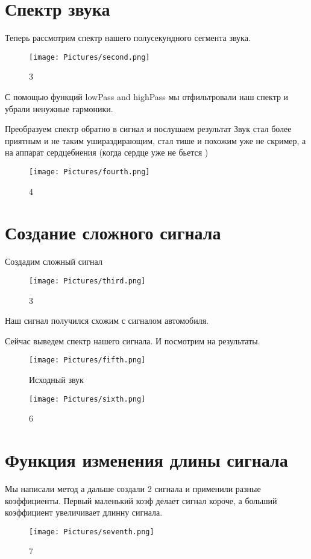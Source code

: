 \documentclass[10pt,a4paper,oneside]{article}
\begin{document}
\section{Спектр звука}

Теперь рассмотрим спектр нашего полусекундного сегмента звука.
\begin{figure}[H]
        \centering
        \texttt{[image: Pictures/second.png]}
        \caption{3}
        \label{fig:second}
\end{figure}

С помощью функций lowPass and highPass мы отфильтровали наш спектр и убрали ненужные гармоники. 

Преобразуем спектр обратно в сигнал и послушаем результат 
Звук стал более приятным и не таким ушираздирающим, стал тише и похожим уже не скример, 
а на аппарат сердцебиения (когда сердце уже не бьется )
\begin{figure}[H]
        \centering
        \texttt{[image: Pictures/fourth.png]}
        \caption{4}
        \label{fig:fourth}
\end{figure}
\section{Создание сложного сигнала}

Создадим сложный сигнал

\begin{figure}[H]
        \centering
        \texttt{[image: Pictures/third.png]}
        \caption{3}
        \label{fig:third}
\end{figure}

Наш сигнал получился схожим с сигналом автомобиля.

Сейчас выведем спектр нашего сигнала. И посмотрим на результаты.
\begin{figure}[H]
        \centering
        \texttt{[image: Pictures/fifth.png]}
        \caption{Исходный звук}
        \label{5}
\end{figure}

\begin{figure}[H]
        \centering
        \texttt{[image: Pictures/sixth.png]}
        \caption{6}
        \label{fig:sixth}
\end{figure}

\section{Функция изменения длины сигнала}
Мы написали метод а дальше создали 2 сигнала и применили разные коэффициенты.
Первый маленький коэф делает сигнал короче, а больший коэффициент увеличивает длинну сигнала.
\begin{figure}[H]
        \centering
        \texttt{[image: Pictures/seventh.png]}
        \caption{7}
        \label{fig:seveth}
\end{figure}
\end{document}
